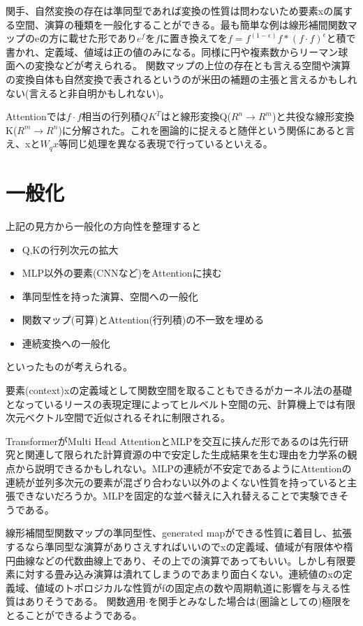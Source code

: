 \documentclass[a4paper,11pt]{article}
\begin{document}
関手、自然変換の存在は準同型であれば変換の性質は問わないため要素xの属する空間、演算の種類を一般化することができる。最も簡単な例は線形補間関数マップのeの方に載せた形であり$e^f$を$f$に置き換えてを$f=f^(1-\epsilon)f*(f\cdot f)^\epsilon$と積で書かれ、定義域、値域は正の値のみになる。同様に円や複素数からリーマン球面への変換などが考えられる。
関数マップの上位の存在とも言える空間や演算の変換自体も自然変換で表されるというのが米田の補題の主張と言えるかもしれない(言えると非自明かもしれない)。

Attentionでは$f\cdot f$相当の行列積$QK^T$はと線形変換Q($R^n \rightarrow R^m$)と共役な線形変換K($R^m \rightarrow R^n$)に分解された。これを圏論的に捉えると随伴という関係にあると言え、xと$W_qx$等同じ処理を異なる表現で行っているといえる。

\section{一般化}
上記の見方から一般化の方向性を整理すると
\begin{itemize}
  \item Q,Kの行列次元の拡大
  \item MLP以外の要素(CNNなど)をAttentionに挟む
  \item 準同型性を持った演算、空間への一般化
  \item 関数マップ(可算)とAttention(行列積)の不一致を埋める
  \item 連続変換への一般化
\end{itemize}
といったものが考えられる。

要素(context)xの定義域として関数空間を取ることもできるがカーネル法の基礎となっているリースの表現定理によってヒルベルト空間の元、計算機上では有限次元ベクトル空間で近似されるそれに制限される。

TransformerがMulti Head AttentionとMLPを交互に挟んだ形であるのは先行研究\cite{Inoue_2022}と関連して限られた計算資源の中で安定した生成結果を生む理由を力学系の観点から説明できるかもしれない。MLPの連続が不安定であるようにAttentionの連続が並列多次元の要素が混ざり合わない以外のよくない性質を持っていると主張できないだろうか。MLPを固定的な並べ替えに入れ替えることで実験できそうである。

線形補間型関数マップの準同型性、generated mapができる性質に着目し、拡張するなら準同型な演算がありさえすればいいのでxの定義域、値域が有限体や楕円曲線などの代数曲線上であり、その上での演算であってもいい。しかし有限要素に対する畳み込み演算は潰れてしまうのであまり面白くない。連続値のxの定義域、値域のトポロジカルな性質がfの固定点の数や周期軌道に影響を与える性質はありそうである。
関数適用$\cdot$を関手とみなした場合は(圏論としての)極限をとることができるようである。
\end{document}
